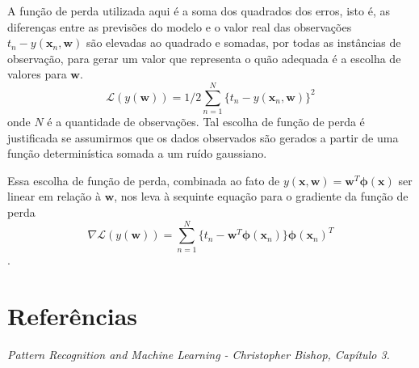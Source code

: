 \documentclass{article}
\begin{document}
A função de perda utilizada aqui é a soma dos quadrados dos erros, isto é, as diferenças entre as previsões do modelo e o
valor real das observações \( t_n - y(\textbf{x}_n, \textbf{w}) \) são elevadas ao quadrado e somadas, por todas as instâncias
de observação, para gerar um valor que representa o quão adequada é a escolha de valores para \(\textbf{w}\).
\[ \mathcal{L}(y(\textbf{w})) = 1/2 \sum_{n=1}^{N} \{ t_n - y(\textbf{x}_n, \textbf{w})\}^2 \]
onde \(N\) é a quantidade de observações. Tal escolha de função de perda é justificada se assumirmos que os dados observados
são gerados a partir de uma função determinística somada a um ruído gaussiano.

Essa escolha de função de perda, combinada ao fato de \( y(\textbf{x}, \textbf{w}) = \textbf{w}^T \boldsymbol{\phi}(\textbf{x}) \) ser linear
em relação à \( \textbf{w} \), nos leva à sequinte equação para o gradiente da função de perda
\[ \nabla \mathcal{L}(y(\textbf{w})) = \sum_{n=1}^{N} \{ t_n - \textbf{w}^T \boldsymbol{\phi}(\textbf{x}_n) \} \boldsymbol{\phi}(\textbf{x}_n)^T \].

\section{Referências}

\emph{Pattern Recognition and Machine Learning - Christopher Bishop, Capítulo 3.}
\end{document}
